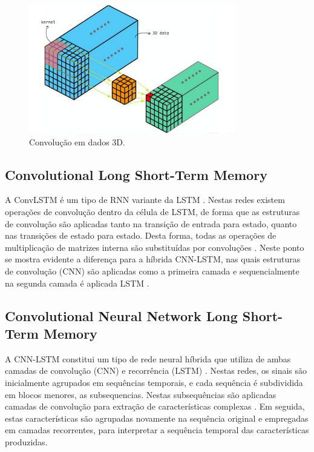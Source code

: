 \begin{figure}[h]
  \centering
  \caption{Convolução em dados 3D.}
   \label{fig:cnn_convolution_3d}
   \includegraphics[width=0.8\textwidth]{figuras/fig_12.png}
\end{figure}

\subsection{Convolutional Long Short-Term Memory}

A ConvLSTM é um tipo de RNN variante da LSTM \cite{Salman2018}. Nestas redes existem operações de convolução dentro da célula de LSTM, de forma que as estruturas de convolução são aplicadas tanto na transição de entrada para estado, quanto nas transições de estado para estado. Desta forma, todas as operações de multiplicação de matrizes interna são substituídas por convoluções \cite{Rahman2019}. Neste ponto se mostra evidente a diferença para a híbrida CNN-LSTM, nas quais estruturas de convolução (CNN) são aplicadas como a primeira camada e sequencialmente na segunda camada é aplicada LSTM \cite{Rahman2019}.

\subsection{Convolutional Neural Network Long Short-Term Memory}

A CNN-LSTM constitui um tipo de rede neural híbrida que utiliza de ambas camadas de convolução (CNN) e recorrência (LSTM) \cite{Deep2019}. Nestas redes, os sinais são inicialmente agrupados em sequências temporais, e cada sequência é subdividida em blocos menores, as subsequencias. Nestas subsequências são aplicadas camadas de convolução para extração de características complexas \cite{Deep2019}. Em seguida, estas características são agrupadas novamente na sequência original e empregadas em camadas recorrentes, para interpretar a sequência temporal das características produzidas.

